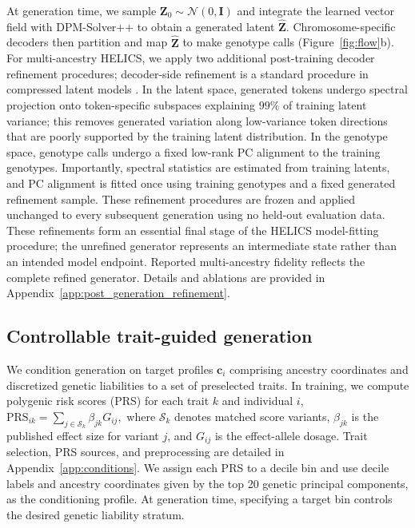 \documentclass{article}
\begin{document}
At generation time, we sample \(\boldsymbol Z_0\sim\mathcal N(0,\boldsymbol I)\) and integrate the learned vector field with DPM-Solver++ \cite{lu2025dpm} to obtain a generated latent $\widehat{\boldsymbol Z}$. Chromosome-specific decoders then partition and map \(\widehat{\boldsymbol Z}\) to make genotype calls (Figure~\ref{fig:flow}b). For multi-ancestry HELICS, we apply two additional post-training decoder refinement procedures; decoder-side refinement is a standard procedure in compressed latent models \cite{chen2025deep, yu2024image, chen2025masked}. In the latent space, generated tokens undergo spectral projection onto token-specific subspaces explaining \(99\%\) of training latent variance; this removes generated variation along low-variance token directions that are poorly supported by the training latent distribution. In the genotype space, genotype calls undergo a fixed low-rank PC alignment to the training genotypes. Importantly, spectral statistics are estimated from training latents, and PC alignment is fitted once using training genotypes and a fixed generated refinement sample. These refinement procedures are frozen and applied unchanged to every subsequent generation using no held-out evaluation data. These refinements form an essential final stage of the HELICS model-fitting procedure; the unrefined generator represents an intermediate state rather than an intended model endpoint. Reported multi-ancestry fidelity reflects the complete refined generator. Details and ablations are provided in Appendix~\ref{app:post_generation_refinement}.


\subsection{Controllable trait-guided generation}
\label{sec:trait-guided-generation}

We condition generation on target profiles \(\boldsymbol{c}_i\) comprising ancestry coordinates and discretized genetic liabilities to a set of preselected traits. In training, we compute polygenic risk scores (PRS) for each trait \(k\) and individual \(i\),
\(\mathrm{PRS}_{ik}=\sum_{j\in\mathcal S_k}\beta_{jk}G_{ij},\)
where \(\mathcal S_k\) denotes matched score variants, \(\beta_{jk}\) is the published effect size for variant \(j\), and \(G_{ij}\) is the effect-allele dosage. Trait selection, PRS sources, and preprocessing are detailed in Appendix~\ref{app:conditions}. We assign each PRS to a decile bin and use decile labels and ancestry coordinates given by the top 20 genetic principal components, as the conditioning profile. At generation time, specifying a target bin controls the desired genetic liability stratum. 
\end{document}
